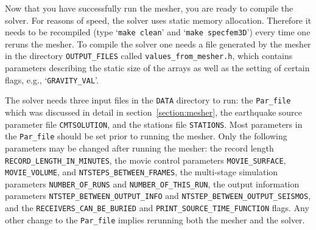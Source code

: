 \documentclass[onecolumn]{article}
\begin{document}
Now that you have successfully run the mesher, you are ready to compile the solver.
For reasons of speed, the solver uses static memory allocation. Therefore it
needs to be recompiled (type `\texttt{make clean}' and `\texttt{make specfem3D}')
every time one reruns the mesher.
To compile the solver one needs a file generated by the mesher in
the directory \texttt{OUTPUT\_FILES} called
\texttt{values\_from\_mesher.h},
which contains parameters describing the static size of the arrays
as well as the setting of certain flags, e.g., `\texttt{GRAVITY\_VAL}'.

The solver needs three input files in the \texttt{DATA} directory to run:
the \texttt{Par\_file} which was discussed in detail in
section~\ref{section:mesher},
the earthquake source parameter file \texttt{CMTSOLUTION}, and the
stations file \texttt{STATIONS}.
Most parameters in the \texttt{Par\_file} should be set
prior to running the mesher. Only the following parameters may be changed
after running the mesher: the record length \texttt{RECORD\_LENGTH\_IN\_MINUTES},
the movie control parameters \texttt{MOVIE\_SURFACE}, \texttt{MOVIE\_VOLUME},
and \texttt{NTSTEPS\_BETWEEN\_FRAMES}, the multi-stage simulation
parameters \texttt{NUMBER\_OF\_RUNS} and \texttt{NUMBER\_OF\_THIS\_RUN},
the output information parameters \texttt{NTSTEP\_BETWEEN\_OUTPUT\_INFO}
and \texttt{NTSTEP\_BETWEEN\_OUTPUT\_SEISMOS},
and the \texttt{RECEIVERS\_CAN\_BE\_BURIED} and
\texttt{PRINT\_SOURCE\_TIME\_FUNCTION} flags.
Any other change to the \texttt{Par\_file} implies rerunning both
the mesher and the solver.
\end{document}
